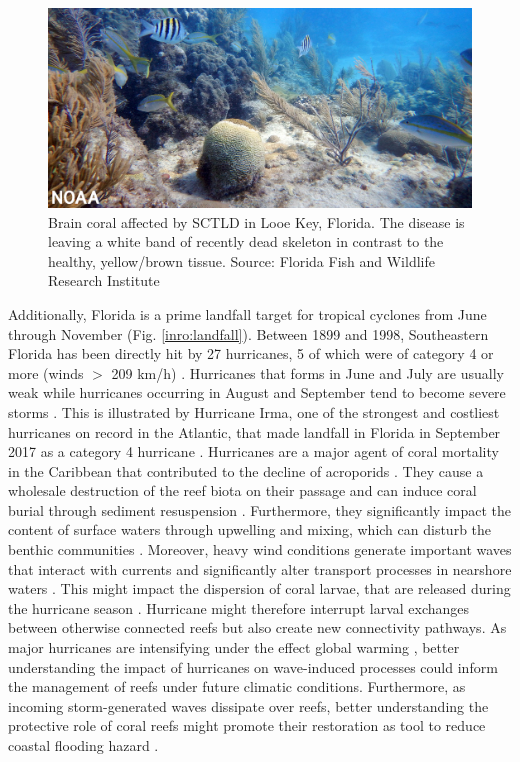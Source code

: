 \begin{figure}
    \centering
    \includegraphics[width=\textwidth]{chapters/intro/figures/sctld.jpg}
    \caption{Brain coral affected by SCTLD in Looe Key, Florida. The disease is leaving a white band of recently dead skeleton in contrast to the healthy, yellow/brown tissue. Source: Florida Fish and Wildlife Research Institute}
    \label{intro:sctld}
\end{figure}

Additionally, Florida is a prime landfall target for tropical cyclones from June through November (Fig. \ref{inro:landfall}). Between 1899 and 1998, Southeastern Florida has been directly hit by 27 hurricanes, 5 of which were of category 4 or more (winds $>$ 209 km/h) \citep{neumann1999tropical}. Hurricanes that forms in June and July are usually weak while hurricanes occurring in August and September tend to become severe storms \citep{banks2008reef}. This is illustrated by Hurricane Irma, one of the strongest and costliest hurricanes on record in the Atlantic, that made landfall in Florida in September 2017 as a category 4 hurricane \citep{irmaNOAA, xian2018brief}. Hurricanes are a major agent of coral mortality in the Caribbean that contributed to the decline of acroporids \citep{gardner2003long,gardner2005hurricanes,aronson2001white}. They cause a wholesale destruction of the reef biota on their passage and can induce coral burial through sediment resuspension \citep{banks2008reef, miller2008effects, tweel2014contribution}. Furthermore, they significantly impact the content of surface waters through upwelling and mixing, which can disturb the benthic communities \citep{wachnicka2019hurricane,varlas2020investigating}. Moreover, heavy wind conditions generate important waves that interact with currents and significantly alter transport processes in nearshore waters \citep{niu2017role,mao2020particle}. This might impact the dispersion of coral larvae, that are released during the hurricane season \citep{hendee1998champ}. Hurricane might therefore interrupt larval exchanges between otherwise connected reefs but also create new connectivity pathways. As major hurricanes are intensifying under the effect global warming \citep{bhatia2019recent,knutson2020tropical}, better understanding the impact of hurricanes on wave-induced processes could inform the management of reefs under future climatic conditions. Furthermore, as incoming storm-generated waves dissipate over reefs, better understanding the protective role of coral reefs might promote their restoration as tool to reduce coastal flooding hazard \citep{roelvink2021coral}.

